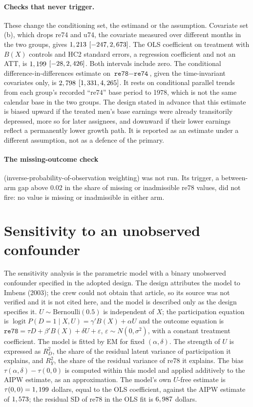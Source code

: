 \documentclass[11pt]{article}
\newcommand{\var}[1]{\texttt{#1}}
\newcommand{\ci}[2]{$[#1, #2]$}
\begin{document}
\paragraph{Checks that never trigger.} These change the conditioning set, the estimand or
the assumption. Covariate set (b), which drops re74 and u74, the covariate measured over
different months in the two groups, gives $1,213$ \ci{\CovsetBCiLow}{\CovsetBCiHigh}.
The OLS coefficient on treatment with $B(X)$ controls and HC2 standard errors, a regression
coefficient and not an ATT, is $1,199$ \ci{\OlsCiLow}{\OlsCiHigh}. Both intervals include
zero. The conditional difference-in-differences estimate on $\var{re78} - \var{re74}$, given
the time-invariant covariates only, is $2,798$
\ci{\DiffSeventyfourCiLow}{\DiffSeventyfourCiHigh}. It rests on conditional parallel trends
from each group's recorded ``re74'' base period to 1978, which is not the same calendar base
in the two groups. The design stated in advance that this estimate is biased upward if the
treated men's base earnings were already transitorily depressed, more so for later
assignees, and downward if their lower earnings reflect a permanently lower growth path. It
is reported as an estimate under a different assumption, not as a defence of the primary.

\paragraph{The missing-outcome check} (inverse-probability-of-observation weighting) was
not run. Its trigger, a between-arm gap above 0.02 in the share of missing or inadmissible
re78 values, did not fire: no value is missing or inadmissible in either arm.

\section{Sensitivity to an unobserved confounder}
\label{sec:sensitivity}

The sensitivity analysis is the parametric model with a binary unobserved confounder
specified in the adopted design. The design attributes the model to Imbens (2003); the crew
could not obtain that article, so its source was not verified and it is not cited here, and
the model is described only as the design specifies it. $U \sim \text{Bernoulli}(0.5)$ is independent of $X$; the
participation equation is $\operatorname{logit} P(D = 1 \mid X, U) = \gamma' B(X) + \alpha U$
and the outcome equation is $\var{re78} = \tau D + \beta' B(X) + \delta U + \varepsilon$,
$\varepsilon \sim N(0, \sigma^2)$, with a constant treatment coefficient. The model is fitted
by EM for fixed $(\alpha, \delta)$. The strength of $U$ is expressed as $R^2_D$, the share of
the residual latent variance of participation it explains, and $R^2_Y$, the share of the
residual variance of re78 it explains. The bias $\tau(\alpha, \delta) - \tau(0, 0)$ is
computed within this model and applied additively to the AIPW estimate, as an
approximation. The model's own $U$-free estimate is $\tau(0, 0) = 1,199$ dollars,
equal to the OLS coefficient, against the AIPW estimate of $1,573$; the residual SD
of re78 in the OLS fit is $6,987$ dollars.
\end{document}
